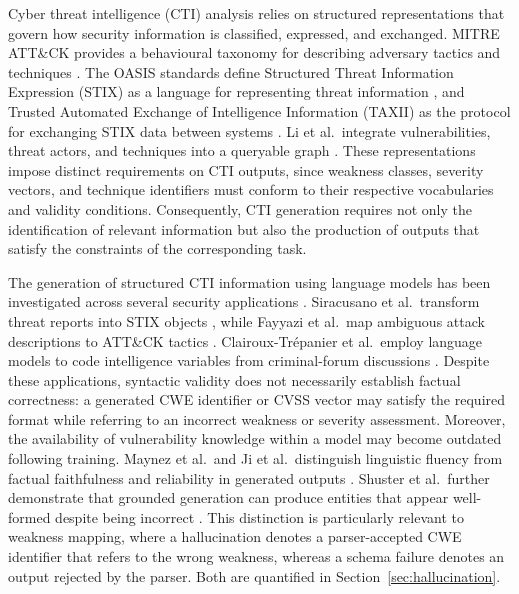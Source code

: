 \documentclass[5p,times,authoryear]{elsarticle}
\begin{document}
Cyber threat intelligence (CTI) analysis relies on structured representations that govern how security information is classified, expressed, and exchanged. MITRE ATT\&CK provides a behavioural taxonomy for describing adversary tactics and techniques \citep{mitre2024attack}. The OASIS standards define Structured Threat Information Expression (STIX) as a language for representing threat information \citep{oasis2021stix}, and Trusted Automated Exchange of Intelligence Information (TAXII) as the protocol for exchanging STIX data between systems \citep{oasis2021taxii}. Li et al.\ integrate vulnerabilities, threat actors, and techniques into a queryable graph \citep{li2022attackg}. These representations impose distinct requirements on CTI outputs, since weakness classes, severity vectors, and technique identifiers must conform to their respective vocabularies and validity conditions. Consequently, CTI generation requires not only the identification of relevant information but also the production of outputs that satisfy the constraints of the corresponding task.

The generation of structured CTI information using language models has been investigated across several security applications \citep{ferrag2024generative,xu2024llm4sec}. Siracusano et al.\ transform threat reports into STIX objects \citep{siracusano2023action}, while Fayyazi et al.\ map ambiguous attack descriptions to ATT\&CK tactics \citeyearpar{fayyazi2023uses}. Clairoux-Trépanier et al.\ employ language models to code intelligence variables from criminal-forum discussions \citep{clairoux2024llm}. Despite these applications, syntactic validity does not necessarily establish factual correctness: a generated CWE identifier or CVSS vector may satisfy the required format while referring to an incorrect weakness or severity assessment. Moreover, the availability of vulnerability knowledge within a model may become outdated following training. Maynez et al.\ and Ji et al.\ distinguish linguistic fluency from factual faithfulness and reliability in generated outputs \citep{maynez2020faithfulness,ji2023survey}. Shuster et al.\ further demonstrate that grounded generation can produce entities that appear well-formed despite being incorrect \citep{shuster2021hallucination}. This distinction is particularly relevant to weakness mapping, where a hallucination denotes a parser-accepted CWE identifier that refers to the wrong weakness, whereas a schema failure denotes an output rejected by the parser. Both are quantified in Section~\ref{sec:hallucination}.
\end{document}
